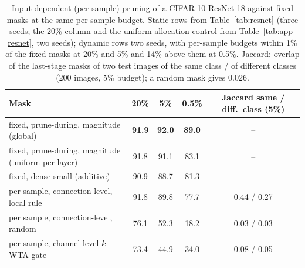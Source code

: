 \documentclass[11pt]{article}
\begin{document}
\begin{table}[t]
\centering\small\setlength{\tabcolsep}{4pt}
\caption{Input-dependent (per-sample) pruning of a CIFAR-10 ResNet-18 against fixed masks at the same per-sample budget.
Static rows from Table~\ref{tab:resnet} (three seeds; the 20\% column and the uniform-allocation control from
Table~\ref{tab:app-resnet}, two seeds); dynamic rows two seeds, with per-sample budgets within 1\% of the fixed masks at
20\% and 5\% and 14\% above them at 0.5\%. Jaccard: overlap of the last-stage masks of two test images of the same class / of different classes (200 images, 5\%
budget); a random mask gives 0.026.}
\label{tab:dynamic}
\begin{tabular}{lcccc}
\toprule
Mask & 20\% & 5\% & 0.5\% & Jaccard same / diff.\ class (5\%) \\
\midrule
fixed, prune-during, magnitude (global)               & \textbf{91.9} & \textbf{92.0} & \textbf{89.0} & -- \\
fixed, prune-during, magnitude (uniform per layer)    & 91.8 & 91.1 & 83.1 & -- \\
fixed, dense small (additive)                         & 90.9 & 88.7 & 81.3 & -- \\
per sample, connection-level, local rule              & 91.8 & 89.8 & 77.7 & 0.44 / 0.27 \\
per sample, connection-level, random                  & 76.1 & 52.3 & 18.2 & 0.03 / 0.03 \\
per sample, channel-level $k$-WTA gate                & 73.4 & 44.9 & 34.0 & 0.08 / 0.05 \\
\bottomrule
\end{tabular}
\end{table}
\end{document}

